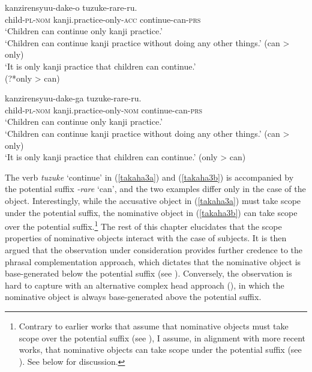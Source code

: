 \documentclass[output=paper]{langscibook}
\begin{document}
\begin{exe}
\ex 

\begin{xlist}

\ex \label{takaha3a}
 {kanzirensyuu-dake-o} {tuzuke-rare-ru.}\\
	child-\textsc{pl}-\textsc{nom}       kanji.practice-only-\textsc{acc} continue-can-\textsc{prs}\\
\glt ‘Children can continue only kanji practice.’\\
	‘Children can continue kanji practice without doing any other things.’ (can \textgreater{} only)\\
 	`It is only kanji practice that children can continue.’\\
(?*only \textgreater{} can)

\ex \label{takaha3b}
 {kanzirensyuu-dake-ga} {tuzuke-rare-ru.}\\
	child-\textsc{pl}-\textsc{nom}       kanji.practice-only-\textsc{nom} continue-can-\textsc{prs}\\
\glt `Children can continue only kanji practice.’\\
`Children can continue kanji practice without doing any other things.' (can \textgreater{} only)\\
`It is only kanji practice that children can continue.’ (only \textgreater{} can)

\end{xlist}
\end{exe}

The verb \emph{tuzuke} ‘continue’ in (\ref{takaha3a}) and (\ref{takaha3b}) is accompanied by the potential suffix \emph{-rare} ‘can’, and the two examples differ only in the case of the object. Interestingly, while the accusative object in (\ref{takaha3a}) must take scope under the potential suffix, the nominative object in (\ref{takaha3b}) can take scope over the potential suffix.\footnote{Contrary to earlier works that assume that nominative objects must take scope over the potential suffix (see \citealt{Tada1992, Koizumi1998, SaitoHoshi1998, Takano2003}), I assume, in alignment with more recent works, that nominative objects can take scope under the potential suffix (see \citealt{nomura2005, Koizumi2008, takahashi2011, FunakoshiTakahashi2014, ochisaruwatari2014a, kasai2018}). See below for discussion.} The rest of this chapter elucidates that the scope properties of nominative objects interact with the case of subjects. It is then argued that the observation under consideration provides further credence to the phrasal complementation approach, which dictates that the nominative object is base-generated below the potential suffix (see \citealt{ bobaljikwurmbrand2005,bobaljikwurmbrand2007, nomura2005, takahashi2011, FunakoshiTakahashi2014, shimamurawurmbrand2014}). Conversely, the observation is hard to capture with an alternative complex head approach (\citealt{SaitoHoshi1998}), in which the nominative object is always base-generated above the potential suffix.
\end{document}
